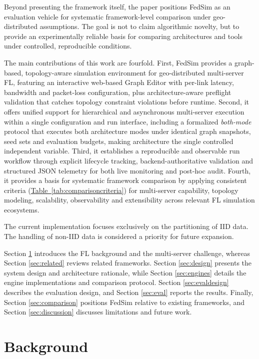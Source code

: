 \documentclass[conference]{IEEEtran}
\newcommand{\tabref}[1]{\hyperref[#1]{Table~\ref*{#1}}}
\begin{document}
Beyond presenting the framework itself, the paper positions FedSim as an evaluation vehicle for systematic framework-level comparison under geo-distributed assumptions. The goal is not to claim algorithmic novelty, but to provide an experimentally reliable basis for comparing architectures and tools under controlled, reproducible conditions.

The main contributions of this work are fourfold. First, FedSim provides a graph-based, topology-aware simulation environment for geo-distributed multi-server FL, featuring an interactive web-based Graph Editor with per-link latency, bandwidth and packet-loss configuration, plus architecture-aware preflight validation that catches topology constraint violations before runtime. Second, it offers unified support for hierarchical and asynchronous multi-server execution within a single configuration and run interface, including a formalized \textit{both-mode} protocol that executes both architecture modes under identical graph snapshots, seed sets and evaluation budgets, making architecture the single controlled independent variable. Third, it establishes a reproducible and observable run workflow through explicit lifecycle tracking, backend-authoritative validation and structured JSON telemetry for both live monitoring and post-hoc audit. Fourth, it provides a basis for systematic framework comparison by applying consistent criteria (\tabref{tab:comparisoncriteria}) for multi-server capability, topology modeling, scalability, observability and extensibility across relevant FL simulation ecosystems.

The current implementation focuses exclusively on the partitioning of IID data. The handling of non-IID data is considered a priority for future expansion.

Section \ref{sec:background} introduces the FL background and the multi-server challenge, whereas Section \ref{sec:related} reviews related frameworks. Section \ref{sec:design} presents the system design and architecture rationale, while Section \ref{sec:engines} details the engine implementations and comparison protocol. Section \ref{sec:evaldesign} describes the evaluation design, and Section \ref{sec:eval} reports the results. Finally, Section \ref{sec:comparison} positions FedSim relative to existing frameworks, and Section \ref{sec:discussion} discusses limitations and future work.

\section{Background}
\label{sec:background}
\end{document}

